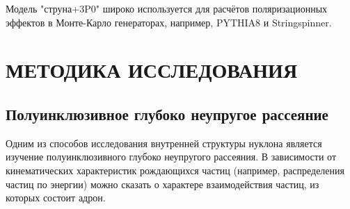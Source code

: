 \documentclass{extreport}
\begin{document}
Модель "струна+3P0" широко используется для расчётов поляризационных эффектов в Монте-Карло генераторах, например, PYTHIA8 и Stringspinner. 
\newpage
\chapter{\MakeUppercase{Методика исследования}}
\thispagestyle{myheadings}
\section{Полуинклюзивное глубоко неупругое рассеяние}
Одним из способов исследования внутренней структуры нуклона является изучение полуинклюзивного глубоко неупругого рассеяния. В зависимости от кинематических характеристик рождающихся частиц (например, распределения частиц по энергии) можно сказать о характере взаимодействия частиц, из которых состоит адрон. 
\end{document}
